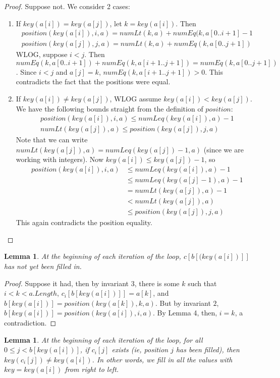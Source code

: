 \documentclass{article}
\newtheorem{lemma}[theorem]{Lemma}
\begin{document}
\begin{proof}
Suppose not. We consider 2 cases:
\begin{enumerate}
\item
If $key(a[i]) = key(a[j])$, let $k = key(a[i])$. Then 
\begin{align*}
position(key(a[i]), i, a) = numLt(k, a) + numEq(k, a[0..i+1] - 1 \\
position(key(a[j]), j, a) = numLt(k, a) + numEq(k, a[0..j+1])
\end{align*}
WLOG, suppose $i < j$. Then $numEq(k, a[0..i+1]) + numEq(k, a[i+1..j+1]) = numEq(k, a[0..j+1])$. Since $i < j$ and $a[j] = k$, $numEq(k, a[i+1..j+1]) > 0$. This contradicts the fact that the positions were equal.
\item
If $key(a[i]) \neq key(a[j])$, WLOG assume $key(a[i]) < key(a[j])$. We have the following bounds straight from the definition of $position$:
\begin{align*}
position(key(a[i]), i, a) \leq numLeq(key(a[i]), a) - 1 \\
numLt(key(a[j]), a) \leq position(key(a[j]), j, a) 
\end{align*}
Note that we can write $numLt(key(a[j]), a) = numLeq(key(a[j]) - 1, a)$ (since we are working with integers). Now $key(a[i]) \leq key(a[j]) - 1$, so 
\begin{align*}
position(key(a[i]), i, a) &\leq numLeq(key(a[i]), a) - 1  \\
&\leq numLeq(key(a[j] - 1), a) - 1 \\
&= numLt(key(a[j]), a) - 1 \\
&< numLt(key(a[j]), a) \\
&\leq position(key(a[j]), j, a)
\end{align*}
This again contradicts the position equality.
\end{enumerate}
\end{proof}
\begin{lemma}
At the beginning of each iteration of the loop, $c[b[(key(a[i])]]$ has not yet been filled in.
\end{lemma}
\begin{proof}
Suppose it had, then by invariant 3, there is some $k$ such that $i < k < a.Length$, $c_i[b[key(a[i])]] = a[k]$, and $b[key(a[i])] = position(key(a[k]), k, a)$. But by invariant $2$, $b[key(a[i])] = position(key(a[i]), i, a)$. By Lemma 4, then, $i = k$, a contradiction.
\end{proof}
\begin{lemma}
At the beginning of each iteration of the loop, for all $0 \leq j < b[key(a[i])]$, if $c_i[j]$ exists (ie, position $j$ has been filled), then $key(c_i[j]) \neq key(a[i])$. In other words, we fill in all the values with $key = key(a[i])$ from right to left.
\end{lemma}
\end{document}
